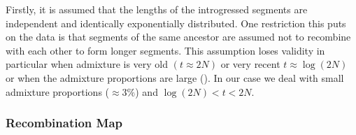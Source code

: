 \documentclass[]{article}
\begin{document}
Firstly, it is assumed that the lengths of the introgressed segments are
independent and identically exponentially distributed. One restriction
this puts on the data is that segments of the same ancestor are assumed
not to recombine with each other to form longer segments. This
assumption loses validity in particular when admixture is very old
\((t \approx 2N)\) or very recent \(t \approx \log(2N)\) or when the
admixture proportions are large (\cite{liang_lengths_2014}). In our case
we deal with small admixture proportions (\(\approx3 \%\)) and
\(\log(2N) < t < 2N\).

\subsubsection{Recombination Map}\label{recombination-map}
\end{document}
